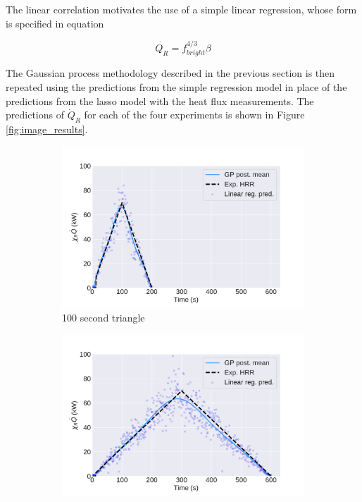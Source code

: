 \documentclass{article}
\begin{document}
The linear correlation motivates the use of a simple linear regression, whose form is specified in equation 

\begin{equation}
  \label{eqn:bright_linear_regression}
 \dot{Q_R} = f_{bright}^{4/3}\beta
\end{equation}

The Gaussian process methodology described in the previous section is then repeated using the predictions from the simple regression model in place of the predictions from the lasso model with the heat flux measurements. The predictions of $\dot{Q}_R$ for each of the four experiments is shown in Figure \ref{fig:image_results}.

\begin{figure}[htbp]
  \centering
  \begin{subfigure}[t]{.45\textwidth}
      \centering
      \includegraphics[width=\textwidth,keepaspectratio]{figures/image_result100s_triangle.pdf}
      \caption{100 second triangle}
      \label{fig:image_result_100s_triangle}
  \end{subfigure}
  \begin{subfigure}[t]{.45\textwidth}
      \centering
      \includegraphics[width=\textwidth ,keepaspectratio]{figures/image_result300s_triangle.pdf}

\end{subfigure}
\end{figure}
\end{document}
